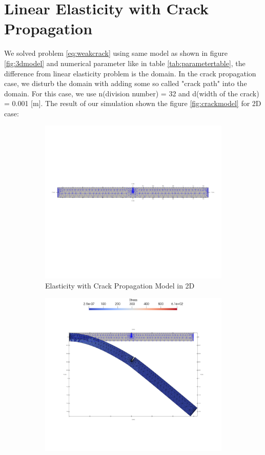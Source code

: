 \documentclass[a4paper,11pt]{article}
\begin{document}
\section{Linear Elasticity with Crack Propagation}
We solved problem \eqref{eq:weakcrack} using same model as shown in figure \ref{fig:3dmodel} and numerical parameter like in table \ref{tab:parametertable}, the difference from linear elasticity problem is the domain. In the crack propagation case, we disturb the domain with adding some so called "crack path" into the domain. For this case, we use n(division number) = 32 and d(width of the crack) = 0.001 [m]. The result of our simulation shown the figure \ref{fig:crackmodel} for 2D case:
\begin{figure}[h!]
	\begin{subfigure}[b]{0.5\linewidth}
		\centering
		\includegraphics[width=\linewidth]{picture/conference/crackmodel2d}
		\caption{Elasticity with Crack Propagation Model in 2D}
		\label{fig:2dcrack}
	\end{subfigure}
	\quad
	\begin{subfigure}[b]{0.5\linewidth}
		\centering
		\includegraphics[width=\linewidth]{picture/conference/cracksol2d}

\end{subfigure}
\end{figure}
\end{document}
